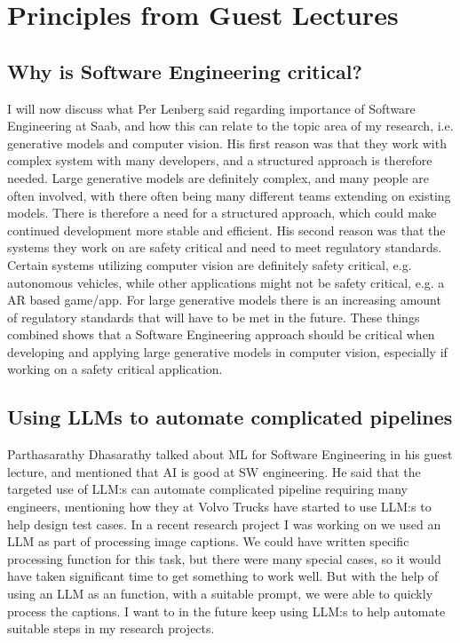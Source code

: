 \documentclass[11pt]{article}
\begin{document}
\section{Principles
from Guest Lectures}

\subsection{Why is Software Engineering critical?}
I will now discuss what Per Lenberg said regarding importance of Software Engineering at Saab, and how this can relate to the topic area of my research, i.e. generative models and computer vision. His first reason was that they work with complex system with many developers, and a structured approach is therefore needed. Large generative models are definitely complex, and many people are often involved, with there often being many different teams extending on existing models. There is therefore a need for a structured approach, which could make continued development more stable and efficient. His second reason was that the systems they work on are safety critical and need to meet regulatory standards. Certain systems utilizing computer vision are definitely safety critical, e.g. autonomous vehicles, while other applications might not be safety critical, e.g. a AR based game/app. For large generative models there is an increasing amount of regulatory standards that will have to be met in the future. These things combined shows that a Software Engineering approach should be critical when developing and applying large generative models in computer vision, especially if working on a safety critical application.

\subsection{Using LLMs to automate complicated pipelines}
Parthasarathy Dhasarathy talked about ML for Software Engineering in his guest lecture, and mentioned that AI is good at SW engineering. He said that the targeted use of LLM:s can automate complicated pipeline requiring many engineers, mentioning how they at Volvo Trucks have started to use LLM:s to help design test cases. In a recent research project I was working on we used an LLM as part of processing image captions. We could have written specific processing function for this task, but there were many special cases, so it would have taken significant time to get something to work well. But with the help of using an LLM as an function, with a suitable prompt, we were able to quickly process the captions. I want to in the future keep using LLM:s to help automate suitable steps in my research projects.
\end{document}
